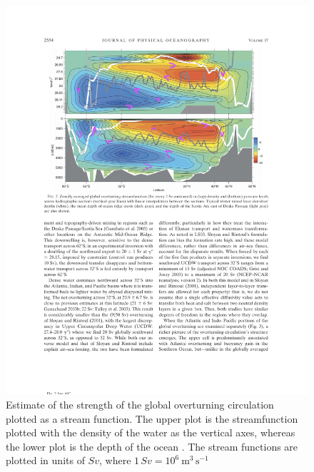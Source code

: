 \begin{figure}[hbt]
  \begin{center}
  \includegraphics{figs/WaterMasses/LumpkinSpeer07Fig2}
    \caption{Estimate of the strength of the global overturning circulation plotted as a stream function.  The upper plot is the streamfunction plotted with the density of the water as the vertical axes, whereas the lower plot is the depth of the ocean \citep{lumpkinspeer07}.  The stream functions are plotted in units of $Sv$, where $1\,Sv = 10^{6}\ \mathrm{m^3\,s^{-1}}$}
    \label{fig:LumpkinSpeer07Fig2}  
  \end{center}
\end{figure}

